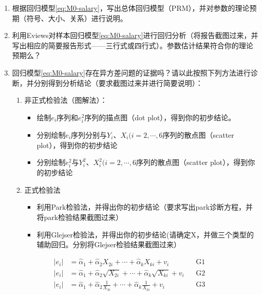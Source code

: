 \documentclass[12pt,(landscape,a4paper),(portrait,a4paper)]{article}
\providecommand{\tightlist}{%
  \setlength{\itemsep}{0pt}\setlength{\parskip}{0pt}}
\begin{document}
\begin{enumerate}
\def\labelenumi{\arabic{enumi}.}
\tightlist
\item
  根据回归模型\eqref{eq:M0-salary}，写出总体回归模型（PRM），并对参数的理论预期（符号、大小、关系）进行说明。\\
\item
  利用Eviews对样本回归模型\eqref{eq:M0-salary}进行回归分析（将报告截图过来，并写出相应的简要报告形式------三行式或四行式）。参数估计结果符合你的理论预期么？\\
\item
  回归模型\eqref{eq:M0-salary}存在异方差问题的证据吗？请以此按照下列方法进行诊断，并分别得到分析结论（要求截图过来并进行简要说明）：

  \begin{enumerate}
  \def\labelenumii{\alph{enumii}.}
  \tightlist
  \item
    非正式检验法（图解法）：

    \begin{itemize}
    \tightlist
    \item
      绘制\(e_i\)序列和\(e^2_i\)序列的描点图（dot
      plot），得到你的初步结论。\\
    \item
      分别绘制\(e_i\)序列分别与\(Y_i\)、\(X_i(i=2,\cdots,6\)序列的散点图（scatter
      plot），得到你的初步结论\\
    \item
      分别绘制\(e^2_i\)与\(Y^2_i\)、\(X^2_i(i=2,\cdots,6\)序列的散点图（scatter
      plot），得到你的初步结论\\
    \end{itemize}
  \item
    正式检验法

    \begin{itemize}
    \tightlist
    \item
      利用Park检验法，并得出你的初步结论（要求写出park诊断方程，并将park检验结果截图过来）\\
    \item
      利用Glejser检验法，并得出你的初步结论(请确定X，并做三个类型的辅助回归。分别将Glejser检验结果截图过来）
    \end{itemize}
  \end{enumerate}
\end{enumerate}

\begin{align}
|e_i| & =\hat{\alpha}_1+\hat{\alpha}_2X_{2i}+\cdots+\hat{\alpha}_kX_{ki}+v_i &&\text{G1} \\
|e_i| & =\hat{\alpha}_1+\hat{\alpha}_2\sqrt{X_{2i}}+\cdots+\hat{\alpha}_k\sqrt{X_{ki}}+v_i &&\text{G2} \\
|e_i| & =\hat{\alpha}_1+\hat{\alpha}_2\frac{1}{X_{2i}}+\cdots+\hat{\alpha}_k\frac{1}{X_{ki}}+v_i &&\text{G3} 
\end{align}
\end{document}
